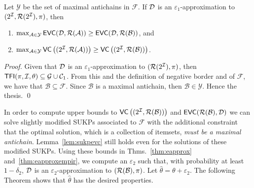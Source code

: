 \begin{lemma}\label{lem:antichains}
  Let $\mathcal{Y}$ be the set of maximal antichains in $\mathcal{F}$. If
  ${\cal D}$ is an $\varepsilon_1$-approximation to $(2^{\cal I},\mathcal{R}(2^{\cal I}),\pi)$, then
  \begin{enumerate}
    \item
      $\max_{\mathcal{A}\in\mathcal{Y}}\mathsf{EVC}({\cal D},\mathcal{R}(\mathcal{A}))\ge\mathsf{EVC}({\cal D},\mathcal{R}(\mathcal{B}))$,
      and
    \item
      $\max_{\mathcal{A}\in\mathcal{Y}}\mathsf{VC}\left((2^{\cal I},\mathcal{R}(\mathcal{A}))\right)\ge\mathsf{VC}\left((2^{\cal I},\mathcal{R}(\mathcal{B}))\right)$.
  \end{enumerate}
\end{lemma}
\ifarxiv
\begin{proof}
  Given %
  that ${\cal D}$ is an $\varepsilon_1$-approximation to $(\mathcal{R}(2^{\cal I}),\pi)$, %
  then %
  $\mathsf{TFI}(\pi,{\cal I},\theta)\subseteq\mathcal{G}\cup\mathcal{C}_1$. 
  From this and
  the definition of negative border and of $\mathcal{F}$, we have that
  $\mathcal{B}\subseteq\mathcal{F}$. Since $\mathcal{B}$ is a maximal
  antichain, then $\mathcal{B}\in\mathcal{Y}$. Hence the thesis.
  \qed
\end{proof}
\fi

In order to compute upper bounds to
$\mathsf{VC}\left((2^{\cal I},\mathcal{R}(\mathcal{B}))\right)$ and
$\mathsf{EVC}(\mathcal{R}(\mathcal{B}),{\cal D})$ we can solve slightly modified SUKPs 
associated to $\mathcal{F}$ with the additional constraint that the
optimal solution, which is a collection of itemsets, \emph{must be a maximal
antichain}. Lemma~\ref{lem:sukpevc} still holds even for the solutions of these
modified SUKPs. Using these bounds in Thms.~\ref{thm:eapprox}
and~\ref{thm:eapproxempir}, we compute an $\varepsilon_2$ such that, with
probability at least $1-\delta_2$, ${\cal D}$ is an $\varepsilon_2$-approximation to
$(\mathcal{R}(\mathcal{B}),\pi)$. Let $\hat{\theta}=\theta+\varepsilon_2$. The
following Theorem shows that $\hat{\theta}$ has the desired properties.


